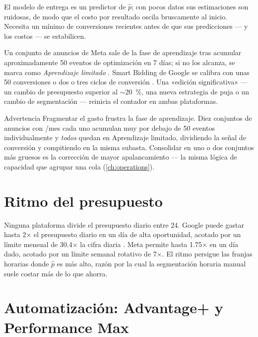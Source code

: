 El modelo de entrega es un predictor de $\hat p$; con pocos datos sus estimaciones son ruidosas, de modo que el costo por resultado oscila bruscamente al inicio. Necesita un mínimo de conversiones recientes antes de que sus predicciones --- y los costos --- se estabilicen.

Un conjunto de anuncios de Meta sale de la fase de aprendizaje tras acumular aproximadamente \num{50} eventos de optimización en \num{7} días; si no los alcanza, se marca como \emph{Aprendizaje limitado} \parencite{metadev-advantage-campaigns}. Smart Bidding de Google se calibra con unas \num{50} conversiones o dos o tres ciclos de conversión \parencite{gads13020501}. Una «edición significativa» --- un cambio de presupuesto superior al \(\sim\)\qty{20}{\percent}, una nueva estrategia de puja o un cambio de segmentación --- reinicia el contador en ambas plataformas.

\begin{admonition}{Advertencia}
Fragmentar el gasto frustra la fase de aprendizaje. Diez conjuntos de anuncios con /mes cada uno acumulan muy por debajo de 50 eventos individualmente y \emph{todos} quedan en Aprendizaje limitado, dividiendo la señal de conversión y compitiendo en la misma subasta. Consolidar en uno o dos conjuntos más gruesos es la corrección de mayor apalancamiento --- la misma lógica de capacidad que agrupar una cola (\cref{ch:operations}).
\end{admonition}

\section{Ritmo del presupuesto}\label{sec:pacing}

Ninguna plataforma divide el presupuesto diario entre 24. Google puede gastar hasta \num{2}$\times$ el presupuesto diario en un día de alta oportunidad, acotado por un límite mensual de \num{30.4}$\times$ la cifra diaria \parencite{gads13685469,gads10486637}. Meta permite hasta \num{1.75}$\times$ en un día dado, acotado por un límite semanal rotativo de \num{7}$\times$. El ritmo persigue las franjas horarias donde $\hat p$ es más alto, razón por la cual la segmentación horaria manual suele costar más de lo que ahorra.

\section{Automatización: Advantage+ y Performance Max}\label{sec:automation}

